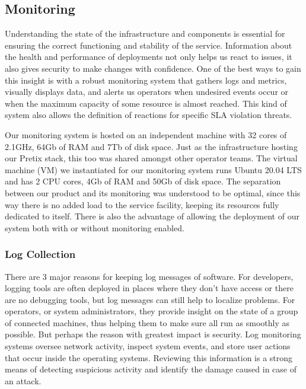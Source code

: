 \documentclass[12pt]{article}
\begin{document}
\vspace{-35pt}

\subsection{Monitoring} \label{management.monitoring} %


Understanding the state of the infrastructure and components is essential for ensuring the correct functioning and stability of the service.
Information about the health and performance of deployments not only helps us react to issues, it also gives security to make changes with confidence.
One of the best ways to gain this insight is with a robust monitoring system that gathers logs and metrics, visually displays data, and alerts us operators when
undesired events occur or when the maximum capacity of some resource is almost reached.
This kind of system also allows the definition of reactions for specific SLA violation threats.

Our monitoring system is hosted on an independent machine with 32 cores of 2.1GHz, 64Gb of RAM and 7Tb of disk space.
Just as the infrastructure hosting our Pretix stack, this too was shared amongst other operator teams.
The virtual machine (VM) we instantiated for our monitoring system runs Ubuntu 20.04 LTS and has 2 CPU cores, 4Gb of RAM and 50Gb of disk space.
The separation between our product and its monitoring was understood to be optimal, since this way there is no added load to the service facility, keeping its
resources fully dedicated to itself.
There is also the advantage of allowing the deployment of our system both with or without monitoring enabled.

\subsubsection{Log Collection}

There are 3 major reasons for keeping log messages of software.
For developers, logging tools are often deployed in places where they don’t have access or there are no debugging tools, but log messages can still help to
localize problems.
For operators, or system administrators, they provide insight on the state of a group of connected machines, thus helping them to make sure all run as
smoothly as possible.
But perhaps the reason with greatest impact is security.
Log monitoring systems oversee network activity, inspect system events, and store user actions that occur inside the operating systems.
Reviewing this information is a strong means of detecting suspicious activity and identify the damage caused in case of an attack.
\end{document}
